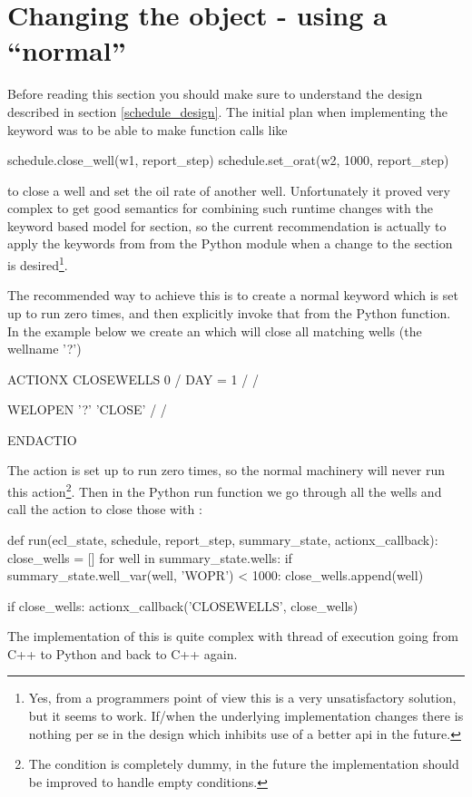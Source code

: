 \section{Changing the  object - using a ``normal'' \actionx{}}
\label{pyaction_actionx}
Before reading this section you should make sure to understand the
 design described in section \ref{schedule_design}. The
initial plan when implementing the \pyaction{} keyword was to be able to make
function calls like
\begin{code}
  schedule.close_well(w1, report_step)
  schedule.set_orat(w2, 1000, report_step)
\end{code}
to close a well and set the oil rate of another well. Unfortunately it proved
very complex to get good semantics for combining such runtime changes with the
keyword based model for  section, so the current recommendation is
actually to apply the keywords from  from the Python module when a
change to the  section is desired\footnote{Yes, from a programmers
point of view this is a very unsatisfactory solution, but it seems to work.
If/when the underlying  implementation changes there is
nothing per se in the \pyaction{} design which inhibits use of a better
 api in the future.}.

The recommended way to achieve this is to create a normal \actionx{} keyword
which is set up to run zero times, and then explicitly invoke that from the
Python  function. In the example below we create an \actionx{}
 which will close all matching wells (the wellname '?')
\begin{deck}
ACTIONX
  CLOSEWELLS 0 /
  DAY = 1 /
/

WELOPEN
  '?' 'CLOSE' /
/

ENDACTIO
\end{deck}
The  action is set up to run zero times, so the normal
\actionx{} machinery will never run this action\footnote{The condition
 is completely dummy, in the future the \actionx{}
implementation should be improved to handle empty conditions.}. Then in the
Python run function we go through all the wells and call the
 action to close those with :
\begin{code}
def run(ecl_state, schedule, report_step, summary_state, actionx_callback):
    close_wells = []
    for well in summary_state.wells:
        if summary_state.well_var(well, 'WOPR') < 1000:
           close_wells.append(well)

    if close_wells:
        actionx_callback('CLOSEWELLS', close_wells)
\end{code}
The implementation of this is quite complex with thread of execution going from
C++ to Python and back to C++ again.



